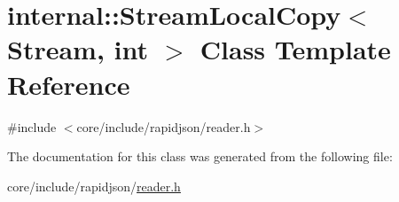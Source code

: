 \hypertarget{classinternal_1_1StreamLocalCopy}{}\section{internal\+:\+:Stream\+Local\+Copy$<$ Stream, int $>$ Class Template Reference}
\label{classinternal_1_1StreamLocalCopy}


{\ttfamily \#include $<$core/include/rapidjson/reader.\+h$>$}



The documentation for this class was generated from the following file\+:\begin{DoxyCompactItemize}
\item 
core/include/rapidjson/\hyperlink{reader_8h}{reader.\+h}\end{DoxyCompactItemize}
